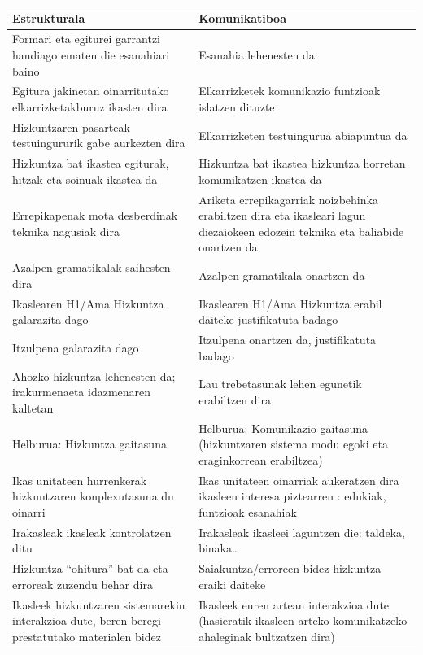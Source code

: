\documentclass[
]{book}
\begin{document}
\begin{longtable}[]{@{}
  >{\raggedright\arraybackslash}p{}
  >{\raggedright\arraybackslash}p{}@{}}
\toprule
Estrukturala & Komunikatiboa \\
\midrule
\endhead
Formari eta egiturei garrantzi handiago ematen die esanahiari baino & Esanahia lehenesten da \\
Egitura jakinetan oinarritutako elkarrizketakburuz ikasten dira & Elkarrizketek komunikazio funtzioak islatzen dituzte \\
Hizkuntzaren pasarteak testuingururik gabe aurkezten dira & Elkarrizketen testuingurua abiapuntua da \\
Hizkuntza bat ikastea egiturak, hitzak eta soinuak ikastea da & Hizkuntza bat ikastea hizkuntza horretan komunikatzen ikastea da \\
Errepikapenak mota desberdinak teknika nagusiak dira & Ariketa errepikagarriak noizbehinka erabiltzen dira eta ikasleari lagun diezaiokeen edozein teknika eta baliabide onartzen da \\
Azalpen gramatikalak saihesten dira & Azalpen gramatikala onartzen da \\
Ikaslearen H1/Ama Hizkuntza galarazita dago & Ikaslearen H1/Ama Hizkuntza erabil daiteke justifikatuta badago \\
Itzulpena galarazita dago & Itzulpena onartzen da, justifikatuta badago \\
Ahozko hizkuntza lehenesten da; irakurmenaeta idazmenaren kaltetan & Lau trebetasunak lehen egunetik erabiltzen dira \\
Helburua: Hizkuntza gaitasuna & Helburua: Komunikazio gaitasuna (hizkuntzaren sistema modu egoki eta eraginkorrean erabiltzea) \\
Ikas unitateen hurrenkerak hizkuntzaren konplexutasuna du oinarri & Ikas unitateen oinarriak aukeratzen dira ikasleen interesa piztearren : edukiak, funtzioak esanahiak \\
Irakasleak ikasleak kontrolatzen ditu & Irakasleak ikasleei laguntzen die: taldeka, binaka\ldots{} \\
Hizkuntza ``ohitura'' bat da eta erroreak zuzendu behar dira & Saiakuntza/erroreen bidez hizkuntza eraiki daiteke \\
Ikasleek hizkuntzaren sistemarekin interakzioa dute, beren-beregi prestatutako materialen bidez & Ikasleek euren artean interakzioa dute (hasieratik ikasleen arteko komunikatzeko ahaleginak bultzatzen dira) \\
\bottomrule
\end{longtable}
\end{document}
